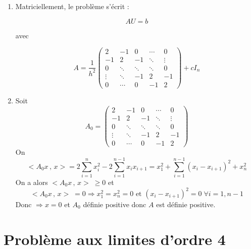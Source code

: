 \documentclass[a4paper,11pt]{article}
\newcommand{\myredbox}[1]{\fcolorbox{red}{white}{$\displaystyle#1$}}
\begin{document}
\begin{enumerate}
\[\begin{array}{lllll}
\end{array}
\]
D'où le système
\[\myredbox{\left\{\begin{array}{lllll}
-{\displaystyle \frac{-2u_1+u_{2}}{h^2}}&+&c u_1 &= &f_1, \\
-{\displaystyle \frac{u_{1}-2u_2+u_{3}}{h^2}}&+&c u_2 &=& f_2, \\
\cdots&\cdots&\cdots&\cdots\\
-{\displaystyle \frac{u_{N-1}-2u_{N}}{h^2}}&+&c u_{N} &=& f_{N},

\end{array}\right.}
\]
\item  Matriciellement, le problème s'écrit : 
 
 \begin{equation}
A U =b
 \end{equation}
 
  avec
 
 
 
 \[A=\frac{1}{h^2}
\left(\begin{array}{ccccc}
2&-1&0&\cdots&0\\
-1&2&-1&\ddots&\vdots\\
0&  \ddots &\ddots&\ddots&0\\
\vdots &\ddots &-1&2&-1\\
   0&\cdots &0&-1 &2
\end{array}\right)+c I_n
\] 
\item Soit \[A_0=
\left(\begin{array}{ccccc}
2&-1&0&\cdots&0\\
-1&2&-1&\ddots&\vdots\\
0&  \ddots &\ddots&\ddots&0\\
\vdots &\ddots &-1&2&-1\\
   0&\cdots &0&-1 &2
\end{array}\right)
\] 
On 
\[<A_0x\,,\, x> = 2\sum_{i=1}^nx_i^2-2\sum_{i=1}^{n-1}x_i x_{i+1}=x_1^2+\sum_{i=1}^{n-1}(x_i-x_{i+1})^2+x_n^2\]
On a alors $<A_0x\,,\, x>\;\geq 0$ et 
\[<A_0x\,,\, x>\;= 0\Longrightarrow x_1^2=x_n^2=0 \mbox{ et }(x_i-x_{i+1})^2=0 \;\forall i=1,n-1\]
Donc $\Longrightarrow x=0$ et $A_0$ définie positive donc $A$ est définie positive.

\end{enumerate}

\section{Problème aux limites d'ordre 4}
\end{document}
